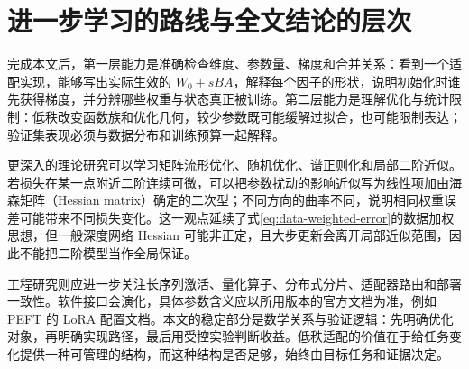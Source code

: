 \documentclass[UTF8,12pt,a4paper,fontset=fandol]{ctexart}
\begin{document}
\section{进一步学习的路线与全文结论的层次}
\label{sec:closing}

完成本文后，第一层能力是准确检查维度、参数量、梯度和合并关系：看到一个适配实现，能够写出实际生效的 $W_0+sBA$，解释每个因子的形状，说明初始化时谁先获得梯度，并分辨哪些权重与状态真正被训练。第二层能力是理解优化与统计限制：低秩改变函数族和优化几何，较少参数既可能缓解过拟合，也可能限制表达；验证集表现必须与数据分布和训练预算一起解释。

更深入的理论研究可以学习矩阵流形优化、随机优化、谱正则化和局部二阶近似。若损失在某一点附近二阶连续可微，可以把参数扰动的影响近似写为线性项加由海森矩阵（Hessian matrix）确定的二次型；不同方向的曲率不同，说明相同权重误差可能带来不同损失变化。这一观点延续了式\eqref{eq:data-weighted-error}的数据加权思想，但一般深度网络 Hessian 可能非正定，且大步更新会离开局部近似范围，因此不能把二阶模型当作全局保证。

工程研究则应进一步关注长序列激活、量化算子、分布式分片、适配器路由和部署一致性。软件接口会演化，具体参数含义应以所用版本的官方文档为准，例如 PEFT 的 LoRA 配置文档\cite{peft-docs}。本文的稳定部分是数学关系与验证逻辑：先明确优化对象，再明确实现路径，最后用受控实验判断收益。低秩适配的价值在于给任务变化提供一种可管理的结构，而这种结构是否足够，始终由目标任务和证据决定。
\end{document}
